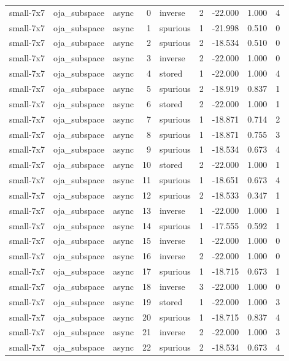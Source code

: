 \begin{tabular}{lllrlrrrr}
small-7x7 & oja\_subspace & async & 0 & inverse & 2 & -22.000 & 1.000 & 4 \\
small-7x7 & oja\_subspace & async & 1 & spurious & 1 & -21.998 & 0.510 & 0 \\
small-7x7 & oja\_subspace & async & 2 & spurious & 2 & -18.534 & 0.510 & 0 \\
small-7x7 & oja\_subspace & async & 3 & inverse & 2 & -22.000 & 1.000 & 0 \\
small-7x7 & oja\_subspace & async & 4 & stored & 1 & -22.000 & 1.000 & 4 \\
small-7x7 & oja\_subspace & async & 5 & spurious & 2 & -18.919 & 0.837 & 1 \\
small-7x7 & oja\_subspace & async & 6 & stored & 2 & -22.000 & 1.000 & 1 \\
small-7x7 & oja\_subspace & async & 7 & spurious & 1 & -18.871 & 0.714 & 2 \\
small-7x7 & oja\_subspace & async & 8 & spurious & 1 & -18.871 & 0.755 & 3 \\
small-7x7 & oja\_subspace & async & 9 & spurious & 1 & -18.534 & 0.673 & 4 \\
small-7x7 & oja\_subspace & async & 10 & stored & 2 & -22.000 & 1.000 & 1 \\
small-7x7 & oja\_subspace & async & 11 & spurious & 1 & -18.651 & 0.673 & 4 \\
small-7x7 & oja\_subspace & async & 12 & spurious & 2 & -18.533 & 0.347 & 1 \\
small-7x7 & oja\_subspace & async & 13 & inverse & 1 & -22.000 & 1.000 & 1 \\
small-7x7 & oja\_subspace & async & 14 & spurious & 1 & -17.555 & 0.592 & 1 \\
small-7x7 & oja\_subspace & async & 15 & inverse & 1 & -22.000 & 1.000 & 0 \\
small-7x7 & oja\_subspace & async & 16 & inverse & 2 & -22.000 & 1.000 & 0 \\
small-7x7 & oja\_subspace & async & 17 & spurious & 1 & -18.715 & 0.673 & 1 \\
small-7x7 & oja\_subspace & async & 18 & inverse & 3 & -22.000 & 1.000 & 0 \\
small-7x7 & oja\_subspace & async & 19 & stored & 1 & -22.000 & 1.000 & 3 \\
small-7x7 & oja\_subspace & async & 20 & spurious & 1 & -18.715 & 0.837 & 4 \\
small-7x7 & oja\_subspace & async & 21 & inverse & 2 & -22.000 & 1.000 & 3 \\
small-7x7 & oja\_subspace & async & 22 & spurious & 2 & -18.534 & 0.673 & 4 \\

\end{tabular}
